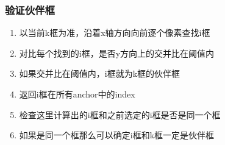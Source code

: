 \documentclass[11pt]{article}
\providecommand{\tightlist}{%
      \setlength{\itemsep}{0pt}\setlength{\parskip}{0pt}}
\begin{document}
    \hypertarget{ux9a8cux8bc1ux4f19ux4f34ux6846}{%
\subsubsection{验证伙伴框}\label{ux9a8cux8bc1ux4f19ux4f34ux6846}}

    \begin{enumerate}
\def\labelenumi{\arabic{enumi}.}
\tightlist
\item
  以当前k框为准，沿着x轴方向向前逐个像素查找i框\\
\item
  对比每个找到的i框，是否y方向上的交并比在阈值内
\item
  如果交并比在阈值内，i框就为k框的伙伴框
\item
  返回i框在所有anchor中的index
\item
  检查这里计算出的i框和之前选定的i框是否是同一个框
\item
  如果是同一个框那么可以确定i框和k框一定是伙伴框
\end{enumerate}
\end{document}
